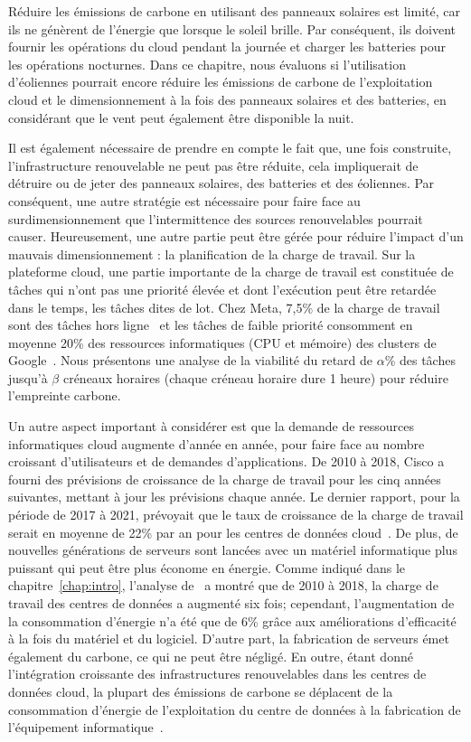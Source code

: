 Réduire les émissions de carbone en utilisant des panneaux solaires est limité, car ils ne génèrent de l'énergie que lorsque le soleil brille. Par conséquent, ils doivent fournir les opérations du cloud pendant la journée et charger les batteries pour les opérations nocturnes. Dans ce chapitre, nous évaluons si l'utilisation d'éoliennes pourrait encore réduire les émissions de carbone de l'exploitation cloud et le dimensionnement à la fois des panneaux solaires et des batteries, en considérant que le vent peut également être disponible la nuit.


Il est également nécessaire de prendre en compte le fait que, une fois construite, l'infrastructure renouvelable ne peut pas être réduite, cela impliquerait de détruire ou de jeter des panneaux solaires, des batteries et des éoliennes. Par conséquent, une autre stratégie est nécessaire pour faire face au surdimensionnement que l'intermittence des sources renouvelables pourrait causer. Heureusement, une autre partie peut être gérée pour réduire l'impact d'un mauvais dimensionnement : la planification de la charge de travail. Sur la plateforme cloud, une partie importante de la charge de travail est constituée de tâches qui n'ont pas une priorité élevée et dont l'exécution peut être retardée dans le temps, les tâches dites de lot. Chez Meta, 7,5\% de la charge de travail sont des tâches hors ligne~\cite{acun2022holistic} et les tâches de faible priorité consomment en moyenne 20\% des ressources informatiques (CPU et mémoire) des clusters de Google~\cite{googleborg_2020}. Nous présentons une analyse de la viabilité du retard de $\alpha$\% des tâches jusqu'à $\beta$ créneaux horaires (chaque créneau horaire dure 1 heure) pour réduire l'empreinte carbone.


Un autre aspect important à considérer est que la demande de ressources informatiques cloud augmente d'année en année, pour faire face au nombre croissant d'utilisateurs et de demandes d'applications. De 2010 à 2018, Cisco a fourni des prévisions de croissance de la charge de travail pour les cinq années suivantes, mettant à jour les prévisions chaque année. Le dernier rapport, pour la période de 2017 à 2021, prévoyait que le taux de croissance de la charge de travail serait en moyenne de 22\% par an pour les centres de données cloud~\cite{cisco_global_cloud_index_2018}. De plus, de nouvelles générations de serveurs sont lancées avec un matériel informatique plus puissant qui peut être plus économe en énergie. Comme indiqué dans le chapitre~\ref{chap:intro}, l'analyse de~\citet{masanet2020recalibrating} a montré que de 2010 à 2018, la charge de travail des centres de données a augmenté six fois; cependant, l'augmentation de la consommation d'énergie n'a été que de 6\% grâce aux améliorations d'efficacité à la fois du matériel et du logiciel. D'autre part, la fabrication de serveurs émet également du carbone, ce qui ne peut être négligé. En outre, étant donné l'intégration croissante des infrastructures renouvelables dans les centres de données cloud, la plupart des émissions de carbone se déplacent de la consommation d'énergie de l'exploitation du centre de données à la fabrication de l'équipement informatique~\cite{gupta2021_chasingcarbon}.


